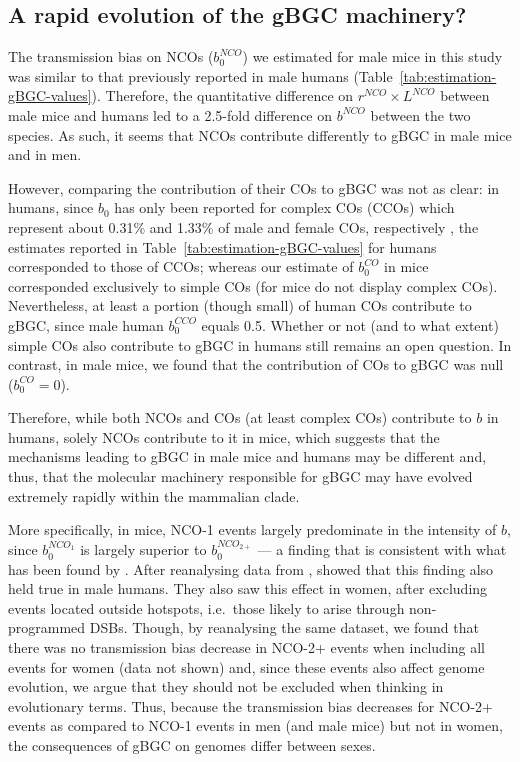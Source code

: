 \subsection{A rapid evolution of the gBGC machinery?}






The transmission bias on NCOs ($b_0^{NCO}$) we estimated for male mice in this study was similar to that previously reported in male humans (Table~\ref{tab:estimation-gBGC-values}).
Therefore, the quantitative difference on $r^{NCO} \times L^{NCO}$ between male mice and humans led to a 2.5-fold difference on $b^{NCO}$ between the two species. 
As such, it seems that NCOs contribute differently to gBGC in male mice and in men.


However, comparing the contribution of their COs to gBGC was not as clear: 
in humans, since $b_0$ has only been reported for complex COs (CCOs) which represent about 0.31\% and 1.33\% of male and female COs, respectively \citep{webb2008sperm, halldorsson2016rate}, the estimates reported in Table~\ref{tab:estimation-gBGC-values} for humans corresponded to those of CCOs; whereas our estimate of $b_0^{CO}$ in mice corresponded exclusively to simple COs (for mice do not display complex COs).
Nevertheless, at least a portion (though small) of human COs contribute to gBGC, since male human $b_0^{CCO}$ equals 0.5. 
Whether or not (and to what extent) simple COs also contribute to gBGC in humans still remains an open question. 
In contrast, in male mice, we found that the contribution of COs to gBGC was null ($b_0^{CO} = 0$).

Therefore, while both NCOs and COs (at least complex COs) contribute to $b$ in humans, solely NCOs contribute to it in mice, which suggests that the mechanisms leading to gBGC in male mice and humans may be different and, thus, that the molecular machinery responsible for gBGC may have evolved extremely rapidly within the mammalian clade.

More specifically, in mice, NCO-1 events largely predominate in the intensity of $b$, since $b_0^{NCO_1}$ is largely superior to $b_0^{NCO_{2+}}$ — a finding that is consistent with what has been found by \citet{li2018highresolution}.
After reanalysing data from \citet{halldorsson2016rate}, \citet{li2018highresolution} showed that this finding also held true in male humans. 
They also saw this effect in women, after excluding events located outside hotspots, i.e.\ those likely to arise through non-programmed DSBs. 
Though, by reanalysing the same dataset, we found that there was no transmission bias decrease in NCO-2+ events when including all events for women (data not shown) and, since these events also affect genome evolution, we argue that they should not be excluded when thinking in evolutionary terms.
Thus, because the transmission bias decreases for NCO-2+ events as compared to NCO-1 events in men (and male mice) but not in women, the consequences of gBGC on genomes differ between sexes.

